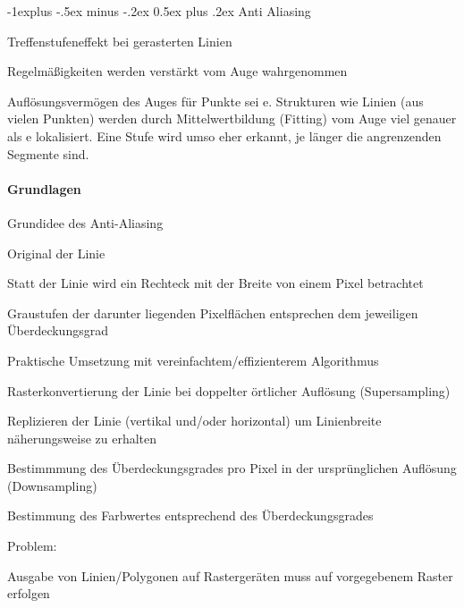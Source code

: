 \documentclass[landscape]{article}
\makeatletter
\renewcommand{\subsection}{\@startsection{subsection}{2}{0mm}%
                                {-1explus -.5ex minus -.2ex}%
                                {0.5ex plus .2ex}%
                                {\normalfont\normalsize\bfseries}}
\makeatother
\begin{document}
\begin{multicols}{3}
  \subsection{Anti Aliasing}
  \begin{itemize*}
    \item Treffenstufeneffekt bei gerasterten Linien
    \item Regelmäßigkeiten werden verstärkt vom Auge wahrgenommen
    \item Auflösungsvermögen des Auges für Punkte sei e. Strukturen wie Linien (aus vielen Punkten) werden durch Mittelwertbildung (Fitting) vom Auge viel genauer als e lokalisiert. Eine Stufe wird umso eher erkannt, je länger die angrenzenden Segmente sind.
  \end{itemize*}
  
  \paragraph{Grundlagen}
  \begin{itemize*}
    \item Grundidee des Anti-Aliasing
          \begin{itemize*}
            \item Original der Linie
            \item Statt der Linie wird ein Rechteck mit der Breite von einem Pixel betrachtet
            \item Graustufen der darunter liegenden Pixelflächen entsprechen dem jeweiligen Überdeckungsgrad
          \end{itemize*}
    \item Praktische Umsetzung mit vereinfachtem/effizienterem Algorithmus
          \begin{itemize*}
            \item Rasterkonvertierung der Linie bei doppelter örtlicher Auflösung (Supersampling)
            \item Replizieren der Linie (vertikal und/oder horizontal) um Linienbreite näherungsweise zu erhalten
            \item Bestimmmung des Überdeckungsgrades pro Pixel in der ursprünglichen Auflösung (Downsampling)
            \item Bestimmung des Farbwertes entsprechend des Überdeckungsgrades
          \end{itemize*}
    \item Problem:
          \begin{itemize*}
            \item Ausgabe von Linien/Polygonen auf Rastergeräten muss auf vorgegebenem Raster erfolgen

\end{itemize*}
\end{itemize*}
\end{multicols}
\end{document}
